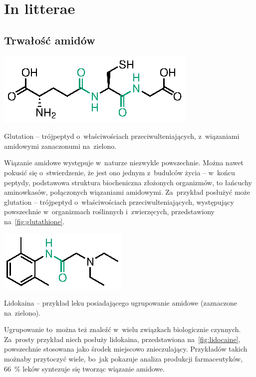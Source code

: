 \chapter{In litterae}


\section{Trwałość amidów}

\begin{marginfigure}[7\baselineskip]
  \includegraphics{schemes/glutathione}
  \caption{
    Glutation \--- trójpeptyd o~właściwościach przeciwulteniających,
    z~wiązaniami amidowymi zanaczonumi na~zielono.
  }
  \label{fig:glutathione}
\end{marginfigure}
Wiązanie amidowe występuje w~naturze niezwykle powszechnie.
Można nawet pokusić się o~stwierdzenie, że jest ono jednym z~budulców życia \---
w~końcu peptydy, podstawowa struktura biocheniczna złożonych organizmów,
to łańcuchy aminowkasów, połączonych wiązaniami amidowymi.
Za~przykład posłużyć może glutation \--- trójpeptyd o~właściwościach przeciwulteniających,
występujący powszechnie w~organizmach roślinnych i~zwierzęcych\autocite{wu04},
przedstawiony na~\cref{fig:glutathione}.
  
\begin{marginfigure}
  \includegraphics{schemes/lidocaine}
  \caption{
    Lidokaina \--- przykład leku posiadającego ugrupowanie amidowe
    (zaznaczone na~zielono).
  }
  \label{fig:lidocaine}
\end{marginfigure}
Ugrupowanie to~można też znaleźć w~wielu związkach biologicznie czynnych.
Za~prosty przykład niech posłuży lidokaina, przedstawiona na~\cref{fig:lidocaine},
powszechnie stosowana jako środek miejscowo znieczulający.
Przykładów takich możnaby przytoczyć wiele, bo~jak pokazuje analiza produkcji farmaceutyków,
\SI{66}{\percent} leków syntezuje się tworząc wiązanie amidowe\autocite{carey06}.

